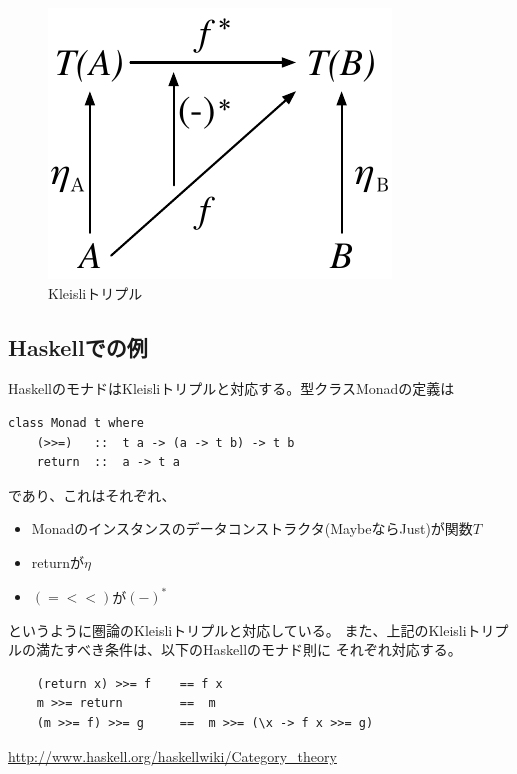 \documentclass{jsarticle}
\begin{document}
\begin{figure}[htbp]
    \centering
    \includegraphics{diag_kleisli.pdf}
    \caption{Kleisliトリプル}
\end{figure}

\subsection{Haskellでの例}
HaskellのモナドはKleisliトリプルと対応する。型クラスMonadの定義は
\begin{lstlisting}
class Monad t where
    (>>=)   ::  t a -> (a -> t b) -> t b
    return  ::  a -> t a
\end{lstlisting}
であり、これはそれぞれ、
\begin{itemize}
    \item Monadのインスタンスのデータコンストラクタ(MaybeならJust)が関数$T$
    \item returnが$\eta$
    \item $(=<<)$が$(-)^*$
\end{itemize}
というように圏論のKleisliトリプルと対応している。
また、上記のKleisliトリプルの満たすべき条件は、以下のHaskellのモナド則に
それぞれ対応する。
\begin{lstlisting}
    (return x) >>= f    == f x
    m >>= return        ==  m
    (m >>= f) >>= g     ==  m >>= (\x -> f x >>= g)
\end{lstlisting}

\begin{thebibliography}{99}

\url{http://www.haskell.org/haskellwiki/Category_theory}

\end{thebibliography}
\end{document}
